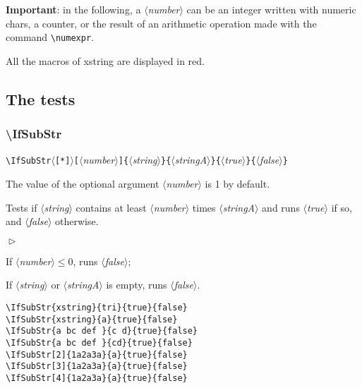 \documentclass[a4paper,10pt]{article}
\newcommand\argu[1]{$\langle$\textit{#1}$\rangle$}
\newcommand\ARGU[1]{\texttt{\{}\argu{#1}\texttt{\}}}
\newcommand\arguC[1]{\texttt{[}\argu{#1}\texttt{]}}
\newcommand\etoile{$\langle$\texttt{[*]}$\rangle$}
\newenvironment{Conditions}[1][1cm]%
{\begin{list}%
	{$\vartriangleright$}%
	{\setlength{\leftmargin}{#1}
	 \setlength{\itemsep}{0pt}
	 \setlength{\parsep}{0pt}
	 \setlength{\topsep}{2ptplus3ptminus2pt}
	}}%
{\end{list}}
\newcommand\Xstring{\textsf{xstring}\xspace}
\newcommand\styleexemple{\small\vskip4pt}
\newcommand\verbinline{\lstinline[basicstyle=\normalsize\ttfamily]}
\begin{document}
\textbf{Important}: in the following, a \argu{number} can be an integer written with numeric chars, a counter, or the result of an arithmetic operation made with the command \verbinline|\numexpr|.\smallskip

All the macros of \Xstring are displayed in {\makeatletter\color{@xs@keywordsxstring}red}.

\subsection{The tests}
\subsubsection{\ttfamily\textbackslash IfSubStr}
\verbinline|\IfSubStr|\etoile\arguC{number}\ARGU{string}\ARGU{stringA}\ARGU{true}\ARGU{false}
\smallskip

The value of the optional argument \argu{number} is 1 by default.\par\smallskip

Tests if \argu{string} contains at least \argu{number} times \argu{stringA} and runs \argu{true} if so, and \argu{false} otherwise.\medskip

\begin{Conditions}
\item If \argu{number}${}\leqslant0$, runs \argu{false};
\item If \argu{string} or \argu{stringA} is empty, runs \argu{false}.
\end{Conditions}

\begin{minipage}[t]{0.65\linewidth}
\begin{lstlisting}
\IfSubStr{xstring}{tri}{true}{false}
\IfSubStr{xstring}{a}{true}{false}
\IfSubStr{a bc def }{c d}{true}{false}
\IfSubStr{a bc def }{cd}{true}{false}
\IfSubStr[2]{1a2a3a}{a}{true}{false}
\IfSubStr[3]{1a2a3a}{a}{true}{false}
\IfSubStr[4]{1a2a3a}{a}{true}{false}
\end{lstlisting}%
\end{minipage}\hfill
\begin{minipage}[t]{0.35\linewidth}
	\styleexemple
	\par
	\par
	\par
	\par
	\par
	\par
\end{minipage}%
\end{document}
